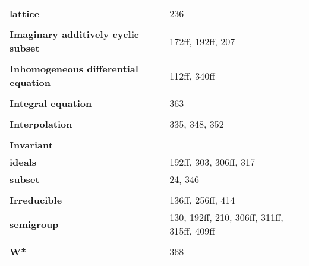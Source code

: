 \documentclass[10pt]{scrartcl}
\begin{document}
\begin{longtable}{>{\bfseries}p{6cm}p{8cm}}
\quad lattice & 236 \\
\\
\textbf{Imaginary additively cyclic subset} & 172ff, 192ff, 207 \\
\\
\textbf{Inhomogeneous differential equation} & 112ff, 340ff \\
\\
\textbf{Integral equation} & 363 \\
\\
\textbf{Interpolation} & 335, 348, 352 \\
\\
\textbf{Invariant} & \\
\quad ideals & 192ff, 303, 306ff, 317 \\
\quad subset & 24, 346 \\
\\
\textbf{Irreducible} & 136ff, 256ff, 414 \\
\quad semigroup & 130, 192ff, 210, 306ff, 311ff, 315ff, 409ff \\
\\
\textbf{W*} & 368 \\

\end{longtable}
\end{document}

